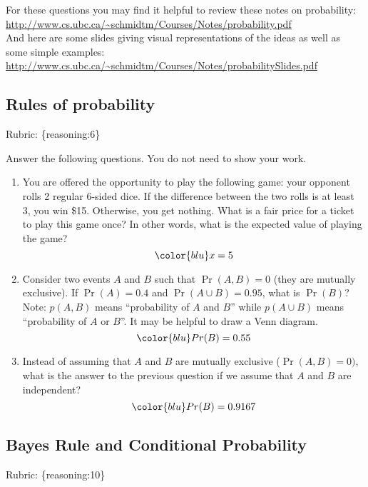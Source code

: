 \documentclass{article}
\def\rubric#1{\gre{Rubric: \{#1\}}}{}
\def\blu#1{{\color{blu}#1}}
\def\gre#1{{\color{gre}#1}}
\begin{document}
For these questions you may find it helpful to review these notes on probability:\\
\url{http://www.cs.ubc.ca/~schmidtm/Courses/Notes/probability.pdf}\\
And here are some slides giving visual representations of the ideas as well as some simple examples:\\
\url{http://www.cs.ubc.ca/~schmidtm/Courses/Notes/probabilitySlides.pdf}

\subsection{Rules of probability}
\rubric{reasoning:6}

\blu{Answer the following questions.} You do not need to show your work.


\begin{enumerate}
\item You are offered the opportunity to play the following game: your opponent rolls 2 regular 6-sided dice. If the difference between the two rolls is at least 3, you win \$15. Otherwise, you get nothing. What is a fair price for a ticket to play this game once? In other words, what is the expected value of playing the game?
\begin{equation}\color{blu} x = 5 \end{equation}
\item Consider two events $A$ and $B$ such that $\Pr(A, B)=0$ (they are mutually exclusive). If $\Pr(A) = 0.4$ and $\Pr(A \cup B) = 0.95$, what is $\Pr(B)$? Note: $p(A, B)$ means
``probability of $A$ and $B$'' while $p(A \cup B)$ means ``probability of $A$ or $B$''. It may be helpful to draw a Venn diagram.
\begin{equation}\color{blu} Pr(B)=0.55 \end{equation}
\item Instead of assuming that $A$ and $B$ are mutually exclusive ($\Pr(A,B) = 0)$, what is the answer to the previous question if we assume that $A$ and $B$ are independent?
\begin{equation}\color{blu} Pr(B)=0.9167 \end{equation}

\end{enumerate}

\subsection{Bayes Rule and Conditional Probability}
\rubric{reasoning:10}
\end{document}
